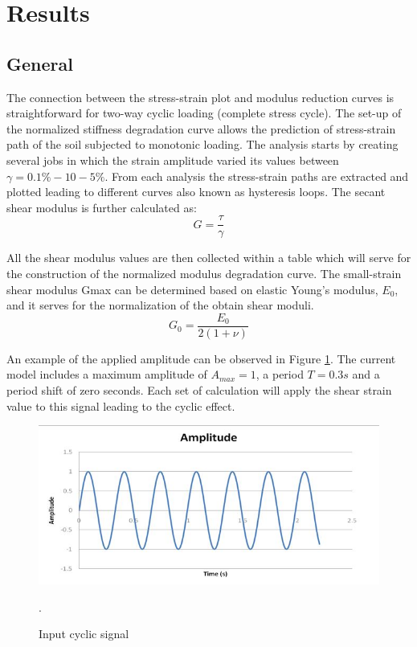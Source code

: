 \documentclass[10pt,a4paper]{report}
\begin{document}
\section{Results}
\subsection{General}
The connection between the stress-strain plot and modulus reduction curves is straightforward for two-way cyclic loading (complete stress cycle). The set-up of the normalized stiffness degradation curve allows the prediction of stress-strain path of the soil subjected to monotonic loading. 
The analysis starts by creating several jobs in which the strain amplitude varied its values between $\gamma=0.1\%-10-5\%$. From each analysis the stress-strain paths are extracted and plotted leading to different curves also known as hysteresis loops. The secant shear modulus is further calculated as:
\begin{equation}
	G=\frac{\tau}{\gamma}
\end{equation}

All the shear modulus values are then collected within a table which will serve for the construction of the normalized modulus degradation curve. The small-strain shear modulus Gmax can be determined based on elastic Young's modulus, $E_0$, and it serves for the normalization of the obtain shear moduli. 
\begin{equation}
	G_0=\frac{E_0}{2(1+\nu)}
\end{equation}

An example of the applied amplitude can be observed in Figure \ref{cyclic}. The current model includes a maximum amplitude of $A_{max} = 1$, a period $T=0.3s$ and a period shift of zero seconds. Each set of calculation will apply the shear strain value to this signal leading to the cyclic effect.

\begin{figure}[h!]
	\centering
	\includegraphics[width=0.7\linewidth]{"cyclicampl"}
	\caption{Input cyclic signal}
	\label{cyclic}.
\end{figure}
\end{document}

